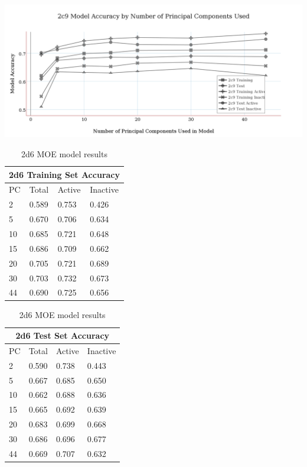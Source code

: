 \includegraphics[width=1\textwidth]{../img/2c9_moe_model_accuracy.png}

\begin{table}[h]
\begin{minipage}{.5\linewidth}
\centering
\begin{tabular}{|l|l|l|l|}
\hline
\multicolumn{4}{|c|}{2d6 Training Set Accuracy} \\ \hline
PC & Total          & Active          & Inactive\\ \hline
2  & 0.589          & 0.753           & 0.426   \\ \hline
5  & 0.670          & 0.706           & 0.634   \\ \hline
10 & 0.685          & 0.721           & 0.648   \\ \hline
15 & 0.686          & 0.709           & 0.662   \\ \hline
20 & 0.705          & 0.721           & 0.689   \\ \hline
30 & 0.703          & 0.732           & 0.673   \\ \hline
44 & 0.690          & 0.725           & 0.656   \\ \hline
\end{tabular}
\end{minipage}
\begin{minipage}{.5\linewidth}
\centering
\begin{tabular}{|l|l|l|l|}
\hline
\multicolumn{4}{|c|}{2d6 Test Set Accuracy}      \\ \hline
PC & Total          & Active          & Inactive \\ \hline
2  & 0.590          & 0.738           & 0.443    \\ \hline
5  & 0.667          & 0.685           & 0.650    \\ \hline
10 & 0.662          & 0.688           & 0.636    \\ \hline
15 & 0.665          & 0.692           & 0.639    \\ \hline
20 & 0.683          & 0.699           & 0.668    \\ \hline
30 & 0.686          & 0.696           & 0.677    \\ \hline
44 & 0.669          & 0.707           & 0.632    \\ \hline
\end{tabular}
\end{minipage}
\caption{2d6 MOE model results}
\end{table}

